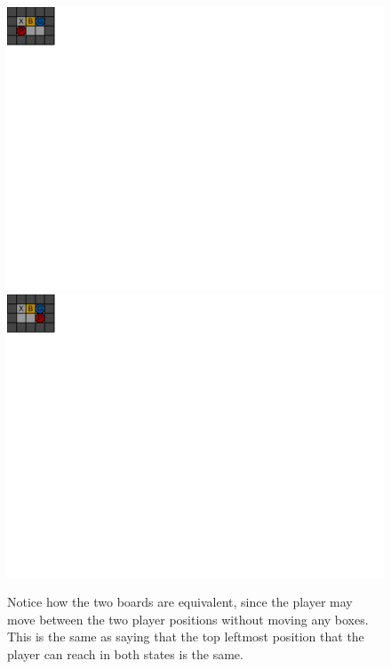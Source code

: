 \documentclass[a4paper,11pt]{article}
\renewcommand{\*}[0]{\cdot}
\begin{document}
\begin{figure}[h!]
    \begin{center}
        \includegraphics{figures/equalState1}
        \includegraphics{figures/equalState2}
    \end{center}
    \caption{Notice how the two boards are equivalent, since the player may move
    between the two player positions without moving any boxes. This is the same
    as saying that the top leftmost position that the player can reach in both
    states is the same.}
    \label{fig:equalStatesDifferentHash}
\end{figure}

\end{document}
